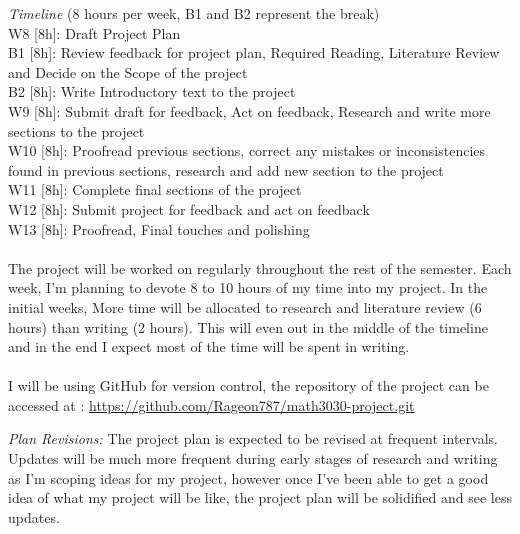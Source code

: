\documentclass[a4paper, 11pt]{article}
\begin{document}
\textit{Timeline} (8 hours per week, B1 and B2 represent the break)
\\
W8 [8h]: Draft Project Plan \\
B1 [8h]: Review feedback for project plan, Required Reading, Literature Review and Decide on the  Scope of the project \\
B2 [8h]: Write Introductory text to the project \\
W9 [8h]: Submit draft for feedback, Act on feedback, Research and write more sections to the project \\
W10 [8h]: Proofread previous sections, correct any mistakes or inconsistencies found in previous sections, research and add new section to the project \\
W11 [8h]: Complete final sections of the project \\
W12 [8h]: Submit project for feedback and act on feedback \\
W13 [8h]: Proofread, Final touches and polishing \\
\\
The project will be worked on regularly throughout the rest of the semester. Each week, I'm planning to devote 8 to 10 hours of my time into my project. In the initial weeks, More time will be allocated to research and literature review (6 hours) than writing (2 hours). This will even out in the middle of the timeline and in the end I expect most of the time will be spent in writing.
\\
\\
I will be using GitHub for version control, the repository of the project can be accessed at : \url{https://github.com/Rageon787/math3030-project.git}


\pagebreak
\textit{Plan Revisions:} The project plan is expected to be revised at frequent intervals. Updates will be much more frequent during early stages of research and writing as I'm scoping ideas for my project, however once I've been able to get a good idea of what my project will be like, the project plan will be solidified and see less updates.
\end{document}
